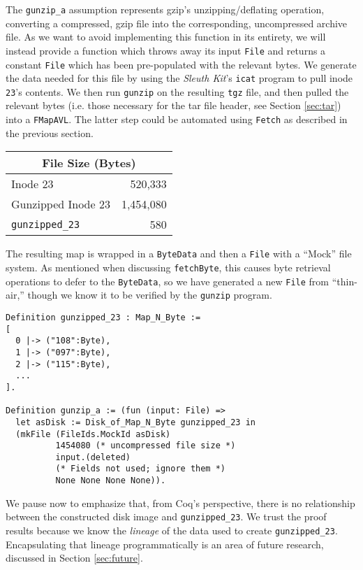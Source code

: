 \documentclass[nocopyrightspace,preprint]{sigplanconf}
\begin{document}
The {\tt gunzip\_a} assumption represents gzip's unzipping/deflating
operation, converting a compressed, gzip file into the corresponding,
uncompressed archive file. As we want to avoid implementing this function in
its entirety, we will instead provide a function which throws away its input
{\tt File} and returns a constant {\tt File} which has been pre-populated with
the relevant bytes. We generate the data needed for this file by using the
{\it Sleuth Kit}'s {\tt icat} program to pull inode {\tt 23}'s contents. We
then run {\tt gunzip} on the resulting {\tt tgz} file, and then pulled the
relevant bytes (i.e. those necessary for the tar file header, see Section
\ref{sec:tar}) into a {\tt FMapAVL}. The latter step could be automated using
{\tt Fetch} as described in the previous section.

\begin{center}
  \begin{tabular}{|l|r|}
    \hline
    \multicolumn{2}{|c|}{File Size (Bytes)}\\
    \hline
    Inode 23            &   520,333\\
    Gunzipped Inode 23  & 1,454,080\\
    {\tt gunzipped\_23} &       580\\
    \hline
  \end{tabular}
\end{center}

The resulting map is wrapped in a {\tt ByteData} and then a {\tt File} with a
``Mock'' file system. As mentioned when discussing {\tt fetchByte}, this
causes byte retrieval operations to defer to the {\tt ByteData}, so we have
generated a new {\tt File} from ``thin-air,'' though we know it to be verified
by the {\tt gunzip} program.

\begin{lstlisting}
Definition gunzipped_23 : Map_N_Byte := 
[ 
  0 |-> ("108":Byte), 
  1 |-> ("097":Byte), 
  2 |-> ("115":Byte), 
  ...
].

Definition gunzip_a := (fun (input: File) => 
  let asDisk := Disk_of_Map_N_Byte gunzipped_23 in
  (mkFile (FileIds.MockId asDisk)
          1454080 (* uncompressed file size *)
          input.(deleted) 
          (* Fields not used; ignore them *)
          None None None None)).
\end{lstlisting}

We pause now to emphasize that, from Coq's perspective, there is no
relationship between the constructed disk image and {\tt gunzipped\_23}. We
trust the proof results because we know the {\em lineage} of the data used to
create {\tt gunzipped\_23}. Encapsulating that lineage programmatically is an
area of future research, discussed in Section \ref{sec:future}.
\end{document}
